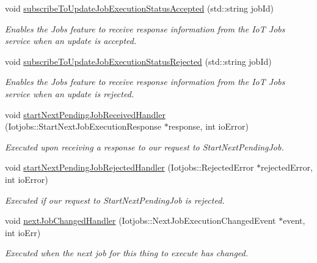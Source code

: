 \begin{DoxyCompactItemize}
void \hyperlink{class_aws_1_1_iot_1_1_device_client_1_1_jobs_1_1_jobs_feature_a15e9508e5eac303329646830223ce927}{subscribe\+To\+Update\+Job\+Execution\+Status\+Accepted} (std\+::string job\+Id)
\begin{DoxyCompactList}\small\item\em Enables the Jobs feature to receive response information from the IoT Jobs service when an update is accepted. \end{DoxyCompactList}\item 
void \hyperlink{class_aws_1_1_iot_1_1_device_client_1_1_jobs_1_1_jobs_feature_a2769b90aae519400c54300cca7d0719c}{subscribe\+To\+Update\+Job\+Execution\+Status\+Rejected} (std\+::string job\+Id)
\begin{DoxyCompactList}\small\item\em Enables the Jobs feature to receive response information from the IoT Jobs service when an update is rejected. \end{DoxyCompactList}\item 
void \hyperlink{class_aws_1_1_iot_1_1_device_client_1_1_jobs_1_1_jobs_feature_a4a976be8e597b38a1eeaaadc6d048739}{start\+Next\+Pending\+Job\+Received\+Handler} (Iotjobs\+::\+Start\+Next\+Job\+Execution\+Response $\ast$response, int io\+Error)
\begin{DoxyCompactList}\small\item\em Executed upon receiving a response to our request to Start\+Next\+Pending\+Job. \end{DoxyCompactList}\item 
void \hyperlink{class_aws_1_1_iot_1_1_device_client_1_1_jobs_1_1_jobs_feature_a974eb6561346d4612c975a9df28ad516}{start\+Next\+Pending\+Job\+Rejected\+Handler} (Iotjobs\+::\+Rejected\+Error $\ast$rejected\+Error, int io\+Error)
\begin{DoxyCompactList}\small\item\em Executed if our request to Start\+Next\+Pending\+Job is rejected. \end{DoxyCompactList}\item 
void \hyperlink{class_aws_1_1_iot_1_1_device_client_1_1_jobs_1_1_jobs_feature_a699398d2cdb6ad04950408f957d57cf0}{next\+Job\+Changed\+Handler} (Iotjobs\+::\+Next\+Job\+Execution\+Changed\+Event $\ast$event, int io\+Err)
\begin{DoxyCompactList}\small\item\em Executed when the next job for this thing to execute has changed. \end{DoxyCompactList}\item 

\end{DoxyCompactItemize}
